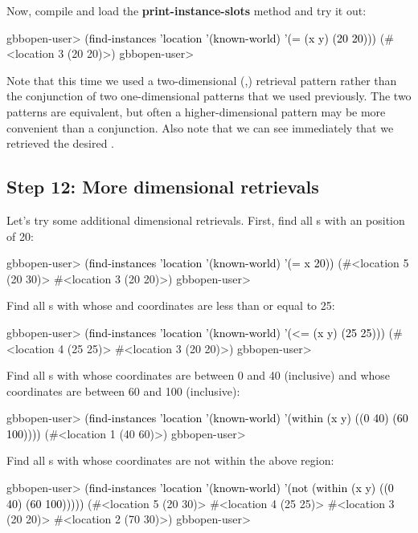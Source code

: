 \documentclass[10pt,twoside,english,pdftex]{article}
\begin{document}
%
%
Now, compile and load the \textbf {print-instance-slots} method and try it
out:
%
\W\supp
\begin{example}
\textcolor{darkergray}{%
  gbbopen-user> \textcolor{black}{(find-instances 'location '(known-world)
                  '(= (x y) (20 20)))}
   (#<location 3 (20 20)>)
  gbbopen-user>}
\end{example}

Note that this time we used a two-dimensional (,) retrieval
pattern rather than the conjunction of two one-dimensional patterns that we
used previously.  The two patterns are equivalent, but often a
higher-dimensional pattern may be more convenient than a conjunction.  Also
note that we can see immediately that we retrieved the desired
.

\subsection*{Step 12: More dimensional retrievals}

%
%
Let's try some additional dimensional retrievals.  First, find all
s with an  position of 20:
%
\W\supp
\begin{example}
\textcolor{darkergray}{%
  gbbopen-user> \textcolor{black}{(find-instances 'location '(known-world)
                  '(= x 20))}
   (#<location 5 (20 30)> #<location 3 (20 20)>)
  gbbopen-user>}
\end{example}
%
Find all s with whose  and  coordinates
are less than or equal to 25:
%
\W\supp\notpretop
\begin{example}
\textcolor{darkergray}{%
  gbbopen-user> \textcolor{black}{(find-instances 'location '(known-world)
                  '(<= (x y) (25 25)))}
  (#<location 4 (25 25)> #<location 3 (20 20)>)
  gbbopen-user>}
\end{example}
%
Find all s with whose  coordinates are between 0 and 40
(inclusive) and whose  coordinates are between 60 and 100 (inclusive):
%
\W\supp\notpretop
\begin{example}
\textcolor{darkergray}{%
  gbbopen-user> \textcolor{black}{(find-instances 'location '(known-world)
                  '(within (x y) ((0 40) (60 100))))}
  (#<location 1 (40 60)>)
  gbbopen-user>}
\end{example}
%
Find all s with whose coordinates are not within the above
region:
%
\W\supp\notpretop
\begin{example}
\textcolor{darkergray}{%
  gbbopen-user> \textcolor{black}{(find-instances 'location '(known-world)
                  '(not (within (x y) ((0 40) (60 100)))))}
  (#<location 5 (20 30)> #<location 4 (25 25)> #<location 3 (20 20)>
   #<location 2 (70 30)>)
  gbbopen-user>}
\end{example}
\end{document}
